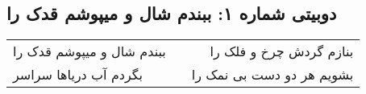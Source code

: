 \begin{center}
\section*{دوبیتی شماره ۱: ببندم شال و میپوشم قدک را}
\label{sec:001}
\begin{longtable}{l p{0.5cm} r}
ببندم شال و میپوشم قدک را
&&
بنازم گردش چرخ و فلک را
\\
بگردم آب دریاها سراسر
&&
بشویم هر دو دست بی نمک را
\\
\end{longtable}
\end{center}
